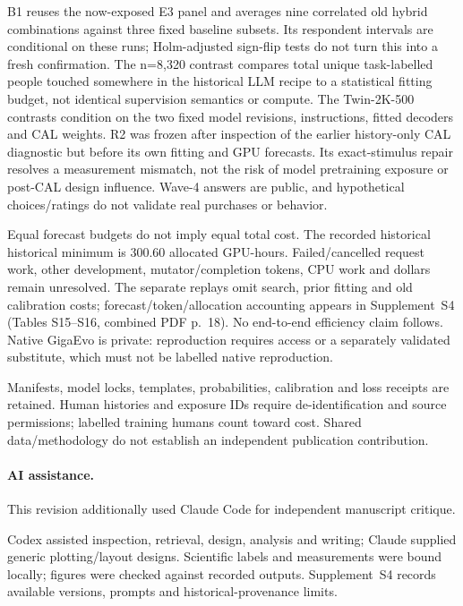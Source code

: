 \documentclass[10pt,twocolumn]{article}
\newcommand{\ArchivalApp}{Supplement~S4}
\begin{document}
B1 reuses the now-exposed E3 panel and averages nine correlated old hybrid
combinations against three fixed baseline subsets. Its respondent intervals
are conditional on these runs; Holm-adjusted sign-flip tests do not turn this
into a fresh confirmation. The n=8,320 contrast compares total unique
task-labelled people touched somewhere in the historical LLM recipe to a
statistical fitting budget, not identical supervision semantics or compute.
The Twin-2K-500 contrasts condition on the two fixed model revisions,
instructions, fitted decoders and CAL weights. R2 was frozen after inspection of the earlier history-only CAL
diagnostic but before its own fitting and GPU forecasts. Its exact-stimulus
repair resolves a measurement mismatch, not the risk of model pretraining
exposure or post-CAL design influence. Wave-4 answers are public, and
hypothetical choices/ratings do not validate real purchases or behavior.

Equal forecast budgets do not imply equal total cost. The recorded historical
historical minimum is 300.60 allocated GPU-hours. Failed/cancelled request work, other
development, mutator/completion tokens, CPU work and dollars remain unresolved.
The separate replays omit search, prior fitting and old calibration costs;
forecast/token/allocation accounting appears in \ArchivalApp{} (Tables
S15--S16, combined PDF p.~18). No end-to-end efficiency claim follows. Native
GigaEvo is private: reproduction requires access or a separately validated
substitute, which must not be labelled native reproduction.

Manifests, model locks, templates, probabilities, calibration and loss receipts
are retained. Human histories and exposure IDs require de-identification and
source permissions; labelled training humans count toward cost. Shared
data/methodology do not establish an independent publication contribution.

\paragraph{AI assistance.}
This revision additionally used Claude Code for independent manuscript critique.

Codex assisted inspection, retrieval, design, analysis and writing; Claude
supplied generic plotting/layout designs. Scientific labels and measurements
were bound locally; figures were checked against recorded outputs. \ArchivalApp{} records available versions, prompts and
historical-provenance limits.
\end{document}

